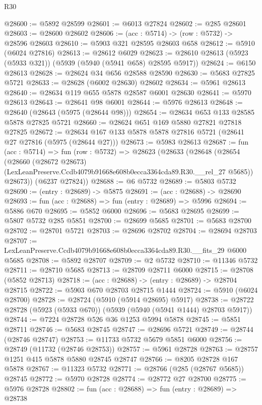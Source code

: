 \begin{lexlean}{R30}
\begin{coremodule}
@28600 := @5892 @28599
@28601 := @6013 @27824
@28602 := @285 @28601
@28603 := @28600 @28602
@28606 := (acc : @5714) -> (row : @5732) -> @28596 @28603
@28610 := @5903 @321 @28595 @28603 @658
@28612 := @5910 (@6024 @27816)
@28613 := @28612 @6029
@28623 := @28610 @28613 (@5923 (@5933 @321)) (@5939 (@5940 (@5941 @658) @28595 @5917))
@28624 := @6150 @28613
@28628 := @28624 @34 @656 @28588 @28590
@28630 := @5683 @27825 @5721
@28633 := @28628 (@6002 @28630) @28602
@28634 := @5961 @28613
@28640 := @28634 @119 @655 @5878 @28587 @6001 @28630
@28641 := @5970 @28613
@28643 := @28641 @98 @6001
@28644 := @5976 @28613
@28648 := @28640 (@28643 (@5975 (@28644 @98)))
@28654 := @28634 @653 @133 @28585 @5878 @27825 @5721
@28660 := @28624 @651 @169 @5880 @27821 @27818 @27825
@28672 := @28634 @167 @133 @5878 @5878 @27816 @5721 (@28641 @27 @27816 (@5975 (@28644 @27)))
@28673 := @5983 @28613
@28687 := fun (acc : @5714) =>
  fun (row : @5732) =>
  @28623
    (@28633
      (@28648
        (@28654
          (@28660
            (@28672 @28673)
            (LexLeanPreserve.Ccdb4079b91668e608b0ecca3364cda89.R30.__rel_27 @5685))
          @28673))
      (@6237 @27824))
@28688 := @6 @5732
@28689 := @5803 @5732
@28690 := (entry : @28689) -> @5875
@28691 := (acc : @28688) -> @28690
@28693 := fun (acc : @28688) => fun (entry : @28689) => @5996
@28694 := @5886 @670
@28695 := @5852 @6000
@28696 := @5683 @28695
@28699 := @5807 @5732 @285 @5851
@28700 := @28699 @5685
@28701 := @5683 @28700
@28702 := @28701 @5721
@28703 := @28696 @28702
@28704 := @28694 @28703
@28707 := LexLeanPreserve.Ccdb4079b91668e608b0ecca3364cda89.R30.__fits_29 @6000 @5685
@28708 := @5892 @28707
@28709 := @2 @5732
@28710 := @11346 @5732
@28711 := @28710 @5685
@28713 := @28709 @28711 @6000
@28715 := @28708 (@5852 @28713)
@28718 := (acc : @28688) -> (entry : @28689) -> @28704 @28715
@28722 := @5903 @670 @28703 @28715 @1444
@28724 := @5910 (@6024 @28700)
@28728 := @28724 (@5910 (@5914 @28695) @5917)
@28738 := @28722 @28728 (@5923 (@5933 @670)) (@5939 (@5940 (@5941 @1444) @28703 @5917))
@28744 := @7224 @28728 @526 @36 @1253 @5994 @5878
@28745 := @5851 @28711
@28746 := @5683 @28745
@28747 := @28696 @5721
@28749 := @28744 (@28746 @28747)
@28753 := @11733 @5732 @5679 @5851 @6000
@28756 := @28749 (@11732 (@28746 @28753))
@28757 := @5961 @28728
@28763 := @28757 @1251 @415 @5878 @5880 @28745 @28747
@28766 := @8205 @28728 @167 @5878
@28767 := @11323 @5732
@28771 := @28766 (@285 (@28767 @5685)) @28745
@28772 := @5970 @28728
@28774 := @28772 @27 @28700
@28775 := @5976 @28728
@28802 := fun (acc : @28688) =>
  fun (entry : @28689) =>
  @28738

\end{coremodule}
\end{lexlean}
